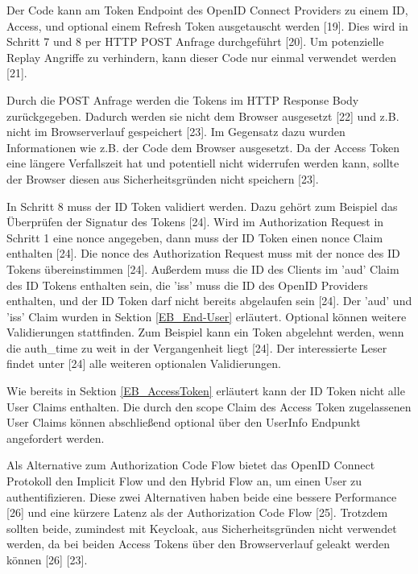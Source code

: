 
Der Code kann am Token Endpoint des OpenID Connect Providers zu einem ID, Access, und optional einem Refresh Token ausgetauscht werden [19]. Dies wird in Schritt 7 und 8 per HTTP POST Anfrage durchgeführt [20]. Um potenzielle Replay Angriffe zu verhindern, kann dieser Code nur einmal verwendet werden [21].

Durch die POST Anfrage werden die Tokens im HTTP Response Body zurückgegeben. Dadurch werden sie nicht dem Browser ausgesetzt [22] und z.B. nicht im Browserverlauf gespeichert [23]. Im Gegensatz dazu wurden Informationen wie z.B. der Code dem Browser ausgesetzt. Da der Access Token eine längere Verfallszeit hat und potentiell nicht widerrufen werden kann, sollte der Browser diesen aus Sicherheitsgründen nicht speichern [23].

In Schritt 8 muss der ID Token validiert werden. Dazu gehört zum Beispiel das Überprüfen der Signatur des Tokens [24]. Wird im Authorization Request in Schritt 1 eine nonce angegeben, dann muss der ID Token einen nonce Claim enthalten [24]. Die nonce des Authorization Request muss mit der nonce des ID Tokens übereinstimmen [24]. Außerdem muss die ID des Clients im 'aud' Claim des ID Tokens enthalten sein, die 'iss' muss die ID des OpenID Providers enthalten, und der ID Token darf nicht bereits abgelaufen sein [24]. Der 'aud' und 'iss' Claim wurden in Sektion \ref{EB_End-User} erläutert. Optional können weitere Validierungen stattfinden. Zum Beispiel kann ein Token abgelehnt werden, wenn die auth\_time zu weit in der Vergangenheit liegt [24]. Der interessierte Leser findet unter [24] alle weiteren optionalen Validierungen.

Wie bereits in Sektion \ref{EB_AccessToken} erläutert kann der ID Token nicht alle User Claims enthalten. Die durch den scope Claim des Access Token zugelassenen User Claims können abschließend optional über den UserInfo Endpunkt angefordert werden.

Als Alternative zum Authorization Code Flow bietet das OpenID Connect Protokoll den Implicit Flow und den Hybrid Flow an, um einen User zu authentifizieren. Diese zwei Alternativen haben beide eine bessere Performance [26] und eine kürzere Latenz als der Authorization Code Flow [25]. Trotzdem sollten beide, zumindest mit Keycloak, aus Sicherheitsgründen nicht verwendet werden, da bei beiden Access Tokens über den Browserverlauf geleakt werden können [26] [23].

